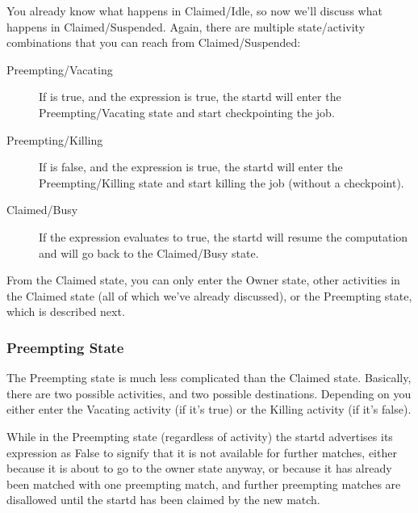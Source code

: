 You already know what happens in Claimed/Idle, so now we'll discuss
what happens in Claimed/Suspended.  Again, there are multiple
state/activity combinations that you can reach from Claimed/Suspended:

\begin{description}
  
\item[Preempting/Vacating] If  is true, and the
   expression is true, the startd will enter the
  Preempting/Vacating state and start checkpointing the job.
  
\item[Preempting/Killing] If  is false, and the
   expression is true, the startd will enter the
  Preempting/Killing state and start killing the job (without a
  checkpoint).
  
\item[Claimed/Busy] If the  expression evaluates to
  true, the startd will resume the computation and will go back to the
  Claimed/Busy state.

\end{description}

From the Claimed state, you can only enter the Owner state, other
activities in the Claimed state (all of which we've already
discussed), or the Preempting state, which is described next.

\subsubsection{Preempting State}
\label{sec:Preempting-State}

The Preempting state is much less complicated than the Claimed state.
Basically, there are two possible activities, and two possible
destinations.  Depending on  you either enter the
Vacating activity (if it's true) or the Killing activity (if it's
false).  

While in the Preempting state (regardless of activity) the startd
advertises its  expression as False to signify that
it is not available for further matches, either because it is about to go
to the owner state anyway, or because it has already been matched with
one preempting match, and further preempting matches are disallowed
until the startd has been claimed by the new match.

